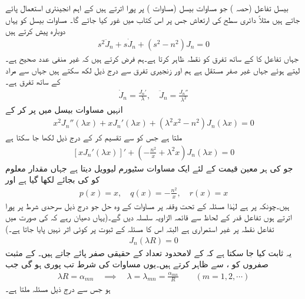 بیسل تفاعل (حصہ )  جو مساوات بیسل (مساوات  ) پر پورا اترتے ہیں کے  اہم انجینئری استعمال پائے جاتے ہیں مثلاً دائری سطح کی ارتعاش جس پر اس کتاب میں غور کیا جائے گا۔ مساوات بیسل کو یہاں دوبارہ پیش کرتے ہیں
\begin{align*}
s^2\ddot{J}_n+s\dot{J}_n+(s^2-n^2)J_n=0
\end{align*}
جہاں تفاعل کا  کے ساتھ تفرق کو نقطہ ظاہر کرتا ہے۔ہم فرض کرتے ہیں کہ  غیر منفی عدد صحیح ہے۔  لیتے ہوئے جہاں  غیر صفر مستقل ہے ہم  اور زنجیری تفرق سے درج ذیل لکھ سکتے ہیں جہاں  سے مراد  کے ساتھ تفرق ہے۔
\begin{align*}
\dot{J}_n=\frac{J_n'}{\lambda}, \quad \ddot{J}_n=\frac{J_n''}{\lambda^2}
\end{align*}
انہیں مساوات بیسل میں پر کر کے
\begin{align*}
x^2J_n''(\lambda x)+xJ_n'(\lambda x)+(\lambda^2 x^2-n^2)J_n(\lambda x)=0
\end{align*}
ملتا ہے جس کو  سے تقسیم کر کے درج ذیل لکھا جا سکتا ہے
\begin{align}\label{مساوات_طاقتی_بیسل_سٹیورم_الف}
[xJ_n'(\lambda x)]'+\left(-\frac{n^2}{x}+\lambda^2 x\right)J_n(\lambda x)=0
\end{align}
جو  کی ہر معین قیمت کے لئے ایک مساوات سٹیورم لیوویل دیتا ہے جہاں مقدار معلوم کو  کی بجائے  لکھا گیا ہے اور 
\begin{align*}
p(x)=x,\quad q(x)=-\frac{n^2}{x},\quad r(x)=x
\end{align*}
ہیں۔چونکہ  پر  ہے لہٰذا مسئلہ  کے تحت وقفہ  پر مساوات  کے وہ حل جو درج ذیل سرحدی شرط پر پورا اترتے ہوں تفاعل قدر  کے لحاظ سے  قائمہ الزاویہ سلسلہ دیں گے۔(یہاں دھیان رہے کہ  کی صورت میں تفاعل  نقطہ  پر غیر استمراری ہے البتہ اس کا مسئلہ  کے ثبوت پر کوئی اثر نہیں پایا جاتا ہے۔)
\begin{align}\label{مساوات_طاقتی_بیسل_سٹیورم_ب}
J_n(\lambda R)=0
\end{align}
یہ ثابت کیا جا سکتا ہے کہ  کے لامحدود تعداد کے حقیقی صفر پائے جاتے ہیں۔  کے مثبت صفروں کو ، سے ظاہر کرتے ہیں۔یوں مساوات  کی شرط تب پوری ہو گی جب
\begin{align}\label{مساوات_طاقتی_بیسل_صفر_الف}
\lambda R=\alpha_{mn} \quad \implies \quad \lambda=\lambda_{mn}=\frac{\alpha_{mn}}{R} \quad \quad (m=1,2,\cdots)
\end{align}
ہو جس سے درج ذیل مسئلہ ملتا ہے۔

